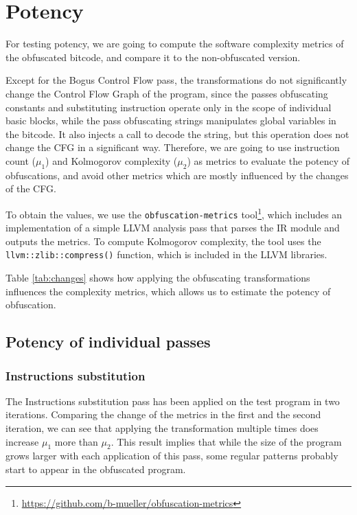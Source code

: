 \documentclass[
  digital, %
  notable,   %
  twoside, %
  nolof,     %
  nolot,     %
]{fithesis3}
\theoremstyle{definition}
\begin{document}
\section{Potency}
For testing potency, we are going to compute the software complexity metrics of the obfuscated bitcode, and compare it to the non-obfuscated version. 

Except for the Bogus Control Flow pass, the transformations do not significantly change the Control Flow Graph of the program, since the passes obfuscating constants and substituting instruction operate only in the scope of individual basic blocks, while the pass obfuscating strings manipulates global variables in the bitcode. It also injects a call to decode the string, but this operation does not change the CFG in a significant way. Therefore, we are going to use instruction count ($\mu_1$) and Kolmogorov complexity ($\mu_2$) as metrics to evaluate the potency of obfuscations, and avoid other metrics which are mostly influenced by the changes of the CFG. 

To obtain the values, we use the \texttt{obfuscation-metrics} tool\footnote{\url{https://github.com/b-mueller/obfuscation-metrics}}, which includes an implementation of a simple LLVM analysis pass that parses the IR module and outputs the metrics. To compute Kolmogorov complexity, the tool uses the \texttt{llvm::zlib::compress()} function, which is included in the LLVM libraries. 

Table \ref{tab:changes} shows how applying the obfuscating transformations influences the complexity metrics, which allows us to estimate the potency of obfuscation. 

\subsection{Potency of individual passes}

\subsubsection{Instructions substitution}
The Instructions substitution pass has been applied on the test program in two iterations. Comparing the change of the metrics in the first and the second iteration, we can see that applying the transformation multiple times does increase $\mu_1$ more than $\mu_2$. This result implies that while the size of the program grows larger with each application of this pass, some regular patterns probably start to appear in the obfuscated program.
\end{document}
